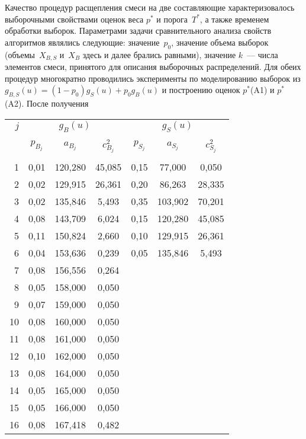 \begin{multicols}{2}
     
     Качество процедур расщепления смеси на две составляющие 
характеризовалось выборочными свойствами оценок веса $p^*$ и порога~$T^*$, 
а также временем обработки выборок. Параметрами задачи сравнительного 
анализа свойств алгоритмов являлись следующие: значение~$p_0$, значение 
объема выборок (объемы~$X_{B,S}$ и~$X_B$ здесь и далее брались равными), 
значение $k$~--- числа элементов смеси, принятого для описания выборочных 
распределений. Для обеих процедур многократно проводились эксперименты по 
моделированию выборок из $g_{B,S}(u) = (1-p_0)g_S(u) +p_0g_B(u)$ и 
построению оценок $p^*$(A1) и $p^*$(A2). После получения\linebreak\vspace*{-12pt}
\pagebreak

\end{multicols}

\begin{table}\small
\begin{center}
\vspace*{2ex}

\begin{tabular}{|r|c|c|c|c|c|c|}
\hline
$j$&\multicolumn{3}{c|}{$g_B(u)$ }&\multicolumn{3}{c|}{$g_S(u)$}\\
\cline{2-7}
&&&&&&\\[-9pt]
&$p_{B_j}$&$a_{B_j}$&$c_{B_j}^2$&$p_{S_j}$&$a_{S_j}$&$c_{S_j}^2$\\
&&&&&&\\[-9pt]
\hline
1&0,01&120,280&45,085\hphantom{9}&0,15&\hphantom{9}77,000&\hphantom{9}0,050\\
2&0,02&129,915&26,361\hphantom{9}&0,20&\hphantom{9}86,263&28,335\\
3&0,02&135,846&5,493&0,35&103,902&70,201\\
4&0,08&143,709&6,024&0,15&120,280&45,085\\
5&0,11&150,824&2,660&0,10&129,915&26,361\\
6&0,04&153,636&0,239&0,05&135,846&\hphantom{9}5,493\\
7&0,08&156,556&0,264&&&\\
8&0,05&158,000&0,050&&&\\
9&0,07&159,000&0,050&&&\\
10&0,08&160,000&0,050&&&\\
11&0,08&161,000&0,050&&&\\
12&0,10&162,000&0,050&&&\\
13&0,08&164,000&0,050&&&\\
14&0,05&165,000&0,050&&&\\
15&0,05&166,000&0,050&&&\\
16&0,08&167,418&0,482&&&\\
\hline
     \end{tabular}
     \end{center}
     \vspace{6pt}
     \end{table}
     
